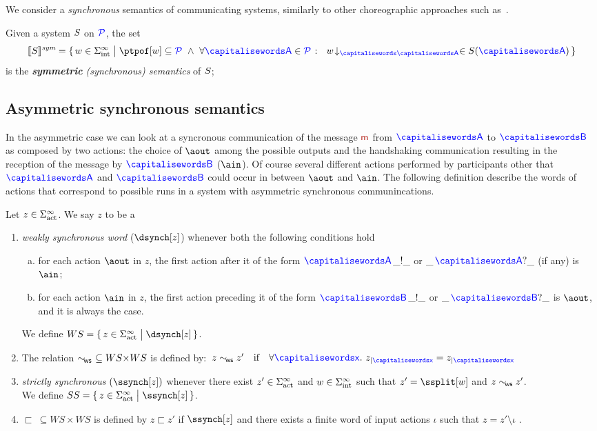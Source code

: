 We consider a \emph{synchronous} semantics of
communicating systems, similarly to other choreographic approaches
such as~\cite{BravettiZ07,CarboneHY12,Dezani-Ciancaglini16,SeveriD19}.

\begin{definition}\label{def:syncSem}
  Given a system $S$ on $\mathcal{\color{blue}{P}}$, the set
  \[
	 \ssem{\aCS} = \Set{\acword \in \alfint^\infty \sst  \ptpof[\acword] \subseteq \ptpset \ \land\ \forall \p \in
		\ptpset \qst \ \proj{\acword}{\p} \in \aCS(\p)}
  \]
  is the \emph{{\bf symmetric} (synchronous) semantics} of $S$;
\end{definition}

\subsection{Asymmetric synchronous semantics}

In the asymmetric case we can look at a syncronous communication of the message $\msg$
from $\p$ to $\q$ as composed by two actions: the choice of $\aout$ among the possible outputs and the
handshaking communication resulting in the reception of the message by $\q$ ($\ain$).
Of course several different actions performed by participants other that $\p$ and $\q$
could occur in between $\aout$ and $\ain$. The following definition describe the words
of actions that correspond to possible runs in a system with asymmetric synchronous communincations.
 

\begin{definition}
Let $z\in\Sigma_{\text{act}}^{\infty}$. We say $z$ to be a 
\begin{enumerate}
\item
{\em  weakly synchronous word} ($\dsynch[z]$) whenever both the following conditions hold
\begin{enumerate}[a)]
\item 
for each action $\aout$ in $z$, the first action after it of the form $\p\,\_!\_$ or  $\_\,\p?\_$ (if any) is $\ain$;
\item
for each action $\ain$ in $z$, the first action preceding it of the form $\q\,\_!\_$ or  $\_\,\q?\_$ is $\aout$, and it is always the case.
\end{enumerate}
We define $WS=\Set{z\in\alfact^\infty \sst \dsynch[z]}$.
\item
The relation $\sim_{\!\mathsf{ws}}\ \subseteq WS{\times}WS$ is defined by:\
$z\commds z'  \quad \text{if} \quad \forall \px.\ \filter{z}{\px}=\filter{z}{\px}$
\item
 {\em strictly synchronous} $(\ssynch[z])$ whenever there exist $z'\in\Sigma_{\text{act}}^{\infty}$ and 
 $w\in\Sigma_{\text{int}}^{\infty}$ such that 
   $z'=\ssplit[w]$ and $z\sim_{\!\mathsf{ws}} z'$.\\
   We define $SS=\Set{z\in\alfact^\infty \sst \ssynch[z]}$.
\item
$\sqsubset\ \subseteq WS\times WS$ is defined by 
$z\sqsubset z'$ if $\ssynch[z]$ and there exists  a finite word of input actions $\iota$ such that $z = z'\setminus \iota$ 
.
\end{enumerate}
\end{definition}





